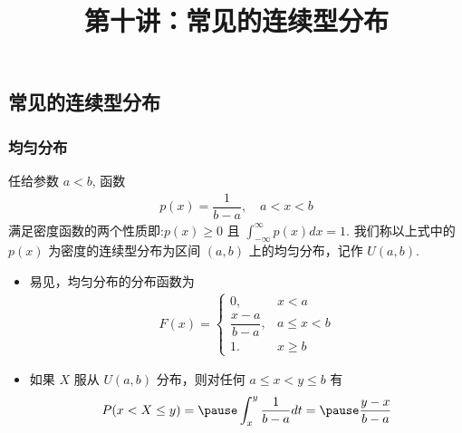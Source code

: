 \title[概率论]{第十讲：常见的连续型分布}

\date{}


{ 
	\begin{frame}
		\titlepage
	\end{frame}
}

\addtocounter{framenumber}{-3}  %
\subsection{常见的连续型分布}
\begin{frame}
	\frametitle{均匀分布}
	\begin{defi}
		任给参数 $a<b$, 函数
		\begin{eqnarray*}
			p(x)=\dfrac{1}{b-a}, \quad a<x<b
		\end{eqnarray*}
		满足密度函数的两个性质即:$p (x)\ge 0$ 且 $\int_{-\infty}^\infty p (x) dx=1$. 我们称以上式中的 $p (x)$ 为密度的连续型分布为区间 $(a,b)$ 上的均匀分布，记作 $U (a,b)$.
	\end{defi}
	\pause

	\begin{itemize}[<+-|alert@+>]
		\item 易见，均匀分布的分布函数为
		      \begin{eqnarray*}
			      F(x)=\left\{
			      \begin{array}{ll}
				      0,                & x<a       \\
				      \dfrac{x-a}{b-a}, & a\leq x<b \\
				      1.                & x\ge b
			      \end{array}
			      \right.
		      \end{eqnarray*}
		\item 如果 $X$ 服从 $U (a,b)$ 分布，则对任何 $a\le x<y\le b$ 有
		      \begin{eqnarray*}
			      P(x<X\le y)=\pause \int_x^y\dfrac{1}{b-a}dt=\pause \dfrac{y-x}{b-a}
		      \end{eqnarray*}

	\end{itemize}

\end{frame}

